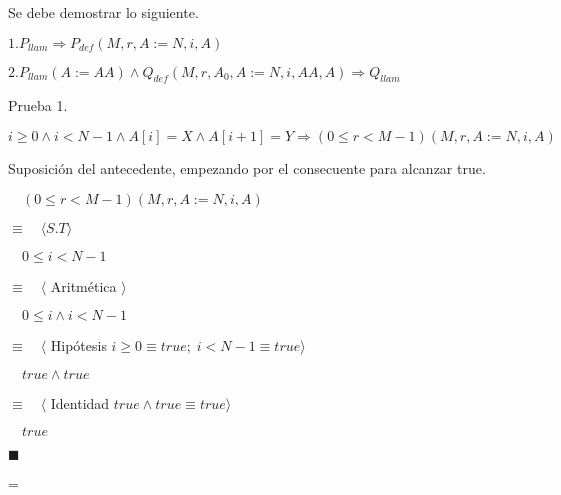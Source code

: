 \documentclass[hidelinks]{article}
\newenvironment{absolutelynopagebreak}
{\par\nobreak\vfil\penalty0\vfilneg
	\vtop\bgroup}
{\par\xdef\tpd{\the\prevdepth}\egroup
	\prevdepth=\tpd}
\begin{document}
Se debe demostrar lo siguiente.\par
$1. P_{llam} \Rightarrow P_{def}(M,r,A := N, i, A)$\par
$2. P_{llam}(A := AA) \land Q_{def}(M, r, A_0, A := N, i, AA, A) \Rightarrow Q_{llam}$\par
\begin{absolutelynopagebreak}
	Prueba 1.\par
	$i \geq 0 \land i < N - 1 \land A[i] = X \land A[i+1] = Y \Rightarrow (0 \leq r < M - 1)(M,r,A := N, i, A)$\par

	Suposición del antecedente, empezando por el consecuente para alcanzar true.\par
	$\quad (0 \leq r < M - 1)(M,r,A := N, i, A)$\par
	$\equiv \quad \langle S.T \rangle$\par
	$\quad 0 \leq i < N - 1$\par
	$\equiv \quad \langle$ Aritmética $ \rangle$\par
	$\quad 0 \leq i \land i < N - 1$\par
	$\equiv \quad \langle$ Hipótesis $ i \geq 0 \equiv true; \; i < N - 1 \equiv true \rangle$\par
	$\quad true \land true$\par
	$\equiv \quad \langle$ Identidad $ true \land true \equiv true \rangle$\par
	$\quad true$\par
	$\blacksquare$\par
\end{absolutelynopagebreak}
\end{document}
